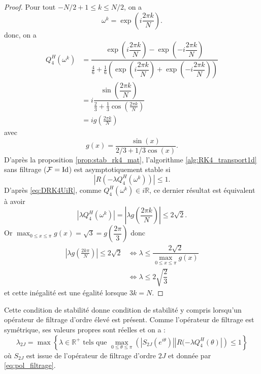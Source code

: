 \begin{proof}
Pour tout $-N/2 + 1 \leq k \leq N/2$, on a
\begin{equation}
\omega^k = \exp \left( i \dfrac{2 \pi k}{N} \right).
\end{equation}
donc, on a 
\begin{align*}
Q_4^H(\omega^k) & = \dfrac{\exp \left( i \dfrac{2 \pi k}{N} \right) - \exp \left(- i \dfrac{2 \pi k}{N} \right)}{\frac{4}{6} + \frac{1}{6} \left( \exp \left( i \dfrac{2 \pi k}{N} \right) + \exp \left( -i \dfrac{2 \pi k}{N} \right) \right)} \\
		& = i \dfrac{\sin \left( \dfrac{2 \pi k}{N} \right)}{\frac{2}{3} + \frac{1}{3} \cos \left( \frac{2 \pi k}{N} \right)}\\
		& = i g \left( \frac{2 \pi k}{N} \right)
\end{align*}
avec 
\begin{equation}
g(x) = \dfrac{\sin(x)}{2/3 + 1/3 \cos (x)}.
\end{equation}
D'après la proposition \ref{prop:stab_rk4_mat}, l'algorithme \ref{alg:RK4_transport1d} sans filtrage ($\mathcal{F} = \text{Id}$) est asymptotiquement stable si
\begin{equation}
| R(- \lambda Q_4^H(\omega^k))| \leq 1.
\end{equation}
D'après \eqref{eq:DRK4UiR}, comme $Q_4^H(\omega^k) \in i \mathbb{R}$, ce dernier résultat est équivalent à avoir 
\begin{equation}
|\lambda Q_4^H(\omega^k)| = |\lambda g \left( \frac{2\pi k}{N} \right)| \leq 2 \sqrt{2}.
\end{equation}
Or $\max_{0 \leq x \leq \pi} g(x) = \sqrt{3} = g \left(\dfrac{2 \pi}{3}\right)$ donc
\begin{align*}
| \lambda g \left( \frac{2 k \pi}{N} \right)| \leq 2 \sqrt{2} & \Leftrightarrow \lambda \leq \dfrac{2 \sqrt{2}}{\max_{0 \leq x \leq \pi} g(x)} \\
	& \Leftrightarrow \lambda \leq 2 \sqrt{\dfrac{2}{3}}
\end{align*}
et cette inégalité est une égalité lorsque $3k=N$.
\end{proof}

Cette condition de stabilité donne condition de stabilité y compris lorsqu'un opérateur de filtrage d'ordre élevé est présent. Comme l'opérateur de filtrage est symétrique, ses valeurs propres sont réelles et on a :
\begin{equation}
\lambda_{2J} = \max \left\lbrace \lambda \in \mathbb{R}^+ \text{ tels que } \max_{0 \leq \theta \leq \pi} \left(|S_{2J}(e^{i \theta})| | R(-\lambda Q_4^H(\theta) | \right) \leq 1 \right\rbrace
\end{equation}
où $S_{2J}$ est issue de l'opérateur de filtrage d'ordre $2J$ et donnée par \eqref{eq:pol_filtrage}.

